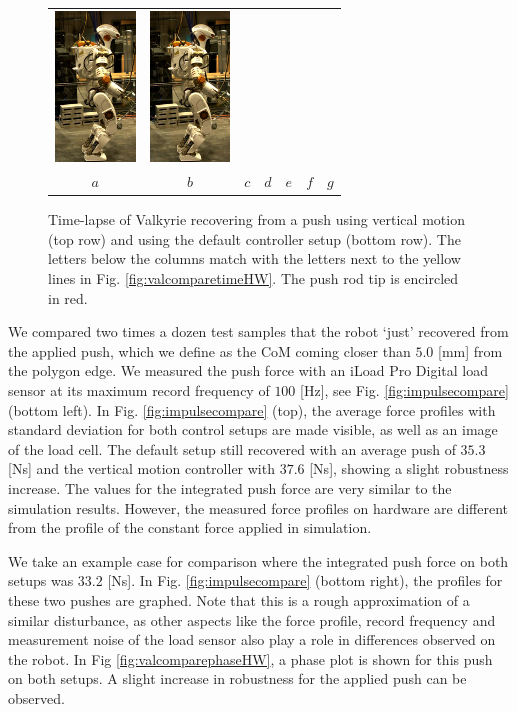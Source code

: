 \documentclass[letterpaper, 10 pt, conference]{ieeeconf}  %
\begin{document}
\begin{figure}[h]
\begin{tabular}{ccccccc}
    \includegraphics[width=0.84in]{val6d_30} &
    \includegraphics[width=0.84in]{val7d_30} \\
    $a$&
    $b$&
    $c$&
    $d$&
    $e$&
    $f$&
    $g$\\
  \end{tabular}
  \caption{Time-lapse of Valkyrie recovering from a push using vertical motion (top row) and using the default controller setup (bottom row). The letters below the columns match with the letters next to the yellow lines in Fig. \ref{fig:valcomparetimeHW}. The push rod tip is encircled in red.}
  \label{fig:val}
\end{figure}
We compared two times a dozen test samples that the robot `just' recovered from the applied push, which we define as the CoM coming closer than $5.0$ [mm] from the polygon edge. We measured the push force with an iLoad Pro Digital load sensor at its maximum record frequency of $100$ [Hz], see Fig. \ref{fig:impulsecompare} (bottom left). In Fig. \ref{fig:impulsecompare} (top), the average force profiles with standard deviation for both control setups are made visible, as well as an image of the load cell. The default setup still recovered with an average push of $35.3$ [Ns] and the vertical motion controller with $37.6$ [Ns], showing a slight robustness increase. The values for the integrated push force are very similar to the simulation results. However, the measured force profiles on hardware are different from the profile of the constant force applied in simulation.

We take an example case for comparison where the integrated push force on both setups was $33.2$ [Ns]. In Fig. \ref{fig:impulsecompare} (bottom right), the profiles for these two pushes are graphed. Note that this is a rough approximation of a similar disturbance, as other aspects like the force profile, record frequency and measurement noise of the load sensor also play a role in differences observed on the robot. In Fig \ref{fig:valcomparephaseHW}, a phase plot is shown for this push on both setups. A slight increase in robustness for the applied push can be observed.
\end{document}
